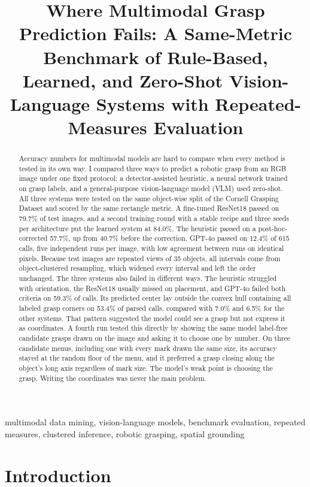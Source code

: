 \documentclass[10pt,conference,compsoc]{IEEEtran}
\title{Where Multimodal Grasp Prediction Fails: A Same-Metric Benchmark of Rule-Based, Learned, and Zero-Shot Vision-Language Systems with Repeated-Measures Evaluation}
\author{\IEEEauthorblockN{Anish Talla}
\IEEEauthorblockA{\textit{High School Student}\\
Lightridge High School and Academies of Loudoun\\
Virginia, United States\\
anish.talla99@gmail.com}}
\begin{document}
\maketitle

\begin{abstract}
Accuracy numbers for multimodal models are hard to compare when every
method is tested in its own way. I compared three ways to predict a robotic grasp from an
RGB image under one fixed protocol: a detector-assisted heuristic, a
neural network trained on grasp labels, and a general-purpose
vision-language model (VLM) used zero-shot. All three systems
were tested on the same object-wise split of the Cornell Grasping Dataset and
scored by the same rectangle metric. A fine-tuned ResNet18 passed on 79.7\%
of test images, and a second training round with a stable recipe and three
seeds per architecture put the learned system at 84.0\%. The heuristic
passed on a post-hoc-corrected 57.7\%, up from 40.7\% before the
correction. GPT-4o passed on 12.4\% of 615 calls, five independent runs per image,
with low agreement between runs on identical pixels. Because test images
are repeated views of 35 objects, all intervals come from object-clustered
resampling, which widened every interval and left the order unchanged. The three systems also failed in different ways. The heuristic struggled with
orientation, the ResNet18 usually missed on placement, and GPT-4o failed
both criteria on 59.3\% of calls. Its predicted
center lay outside the convex hull containing all labeled grasp corners on 53.4\%
of parsed calls, compared with 7.0\% and 6.5\% for the other systems. That
pattern suggested the model could see a grasp but not express it as
coordinates. A fourth run tested this directly by showing the same model
label-free candidate grasps drawn on the image and asking it to choose one
by number. On three candidate menus, including one with every mark drawn
the same size, its accuracy stayed at the random floor of the menu, and it
preferred a grasp closing along the object's long axis regardless of mark
size. The model's weak point is choosing the grasp. Writing the
coordinates was never the main problem.
\end{abstract}

\begin{IEEEkeywords}
multimodal data mining, vision-language models, benchmark evaluation,
repeated measures, clustered inference, robotic grasping, spatial grounding
\end{IEEEkeywords}

\section{Introduction}
\end{document}
